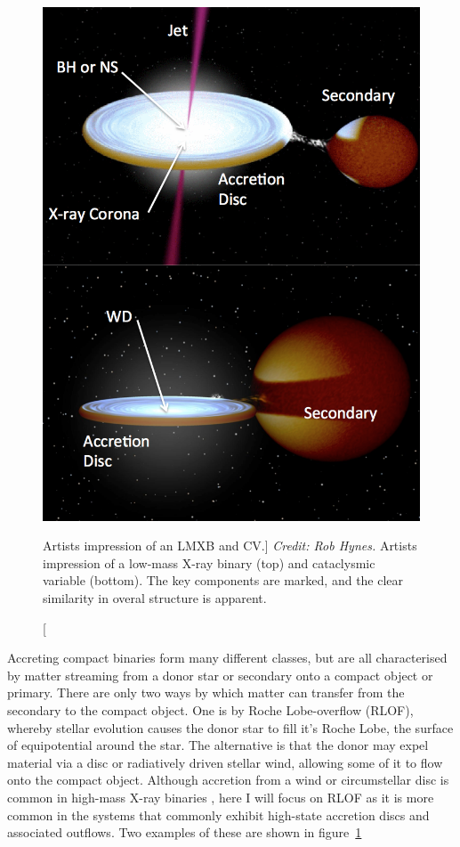 \begin{figure}
\centering
\includegraphics[width=1.0\textwidth]{figures/01-intro/cv_and_xrb.png}
\caption
[Artists impression of an LMXB and CV.]
{
{\sl Credit: Rob Hynes.} 
Artists impression of a low-mass X-ray binary (top) and
cataclysmic variable (bottom). The key components are marked,
and the clear similarity in overal structure is apparent.
} 
\label{fig:cv_and_xrb}
\end{figure}

Accreting compact binaries form many different classes, 
but are all characterised by matter streaming from a donor star or secondary
onto a compact object or primary.
There are only two ways by which matter can transfer 
from the secondary to the compact object. One is by Roche Lobe-overflow (RLOF),
whereby stellar evolution causes the donor star to fill it's Roche Lobe, the surface
of equipotential around the star. The alternative is that the donor may expel
material via a disc or radiatively driven stellar wind, 
allowing some of it to flow onto the compact object. 
Although accretion from a wind or circumstellar disc is common in 
high-mass X-ray binaries \citep[HMXBs; e.g.][]{bartlett2013}, here I will focus on 
RLOF as it is more common in the systems that commonly exhibit high-state accretion discs
and associated outflows. Two examples of these are shown in figure~\ref{fig:cv_and_xrb}


